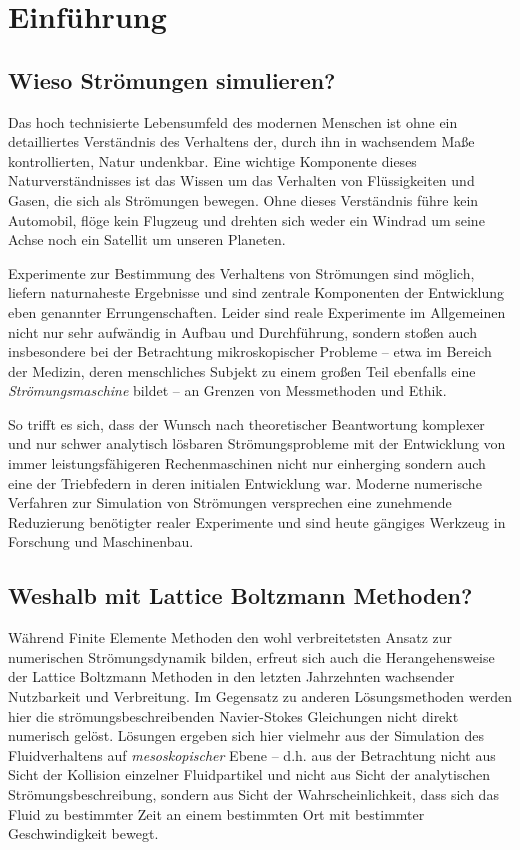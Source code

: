 \section{Einführung}

\subsection{Wieso Strömungen simulieren?}

Das hoch technisierte Lebensumfeld des modernen Menschen ist ohne ein detailliertes Verständnis des Verhaltens der, durch ihn in wachsendem Maße kontrollierten, Natur undenkbar. Eine wichtige Komponente dieses Naturverständnisses ist das Wissen um das Verhalten von Flüssigkeiten und Gasen, die sich als Strömungen bewegen. Ohne dieses Verständnis führe kein Automobil, flöge kein Flugzeug und drehten sich weder ein Windrad um seine Achse noch ein Satellit um unseren Planeten.

Experimente zur Bestimmung des Verhaltens von Strömungen sind möglich, liefern naturnaheste Ergebnisse und sind zentrale Komponenten der Entwicklung eben genannter Errungenschaften. Leider sind reale Experimente im Allgemeinen nicht nur sehr aufwändig in Aufbau und Durchführung, sondern stoßen auch insbesondere bei der Betrachtung mikroskopischer Probleme -- etwa im Bereich der Medizin, deren menschliches Subjekt zu einem großen Teil ebenfalls eine \emph{Strömungsmaschine} bildet -- an Grenzen von Messmethoden und Ethik.

So trifft es sich, dass der Wunsch nach theoretischer Beantwortung komplexer und nur schwer analytisch lösbaren Strömungsprobleme mit der Entwicklung von immer leistungsfähigeren Rechenmaschinen nicht nur einherging sondern auch eine der Triebfedern in deren initialen Entwicklung war. Moderne numerische Verfahren zur Simulation von Strömungen versprechen eine zunehmende Reduzierung benötigter realer Experimente und sind heute gängiges Werkzeug in Forschung und Maschinenbau.

\subsection{Weshalb mit Lattice Boltzmann Methoden?}

Während Finite Elemente Methoden den wohl verbreitetsten Ansatz zur numerischen Strömungsdynamik bilden, erfreut sich auch die Herangehensweise der Lattice Boltzmann Methoden in den letzten Jahrzehnten wachsender Nutzbarkeit und Verbreitung. Im Gegensatz zu anderen Lösungsmethoden werden hier die strömungsbeschreibenden Navier-Stokes Gleichungen nicht direkt numerisch gelöst. Lösungen ergeben sich hier vielmehr aus der Simulation des Fluidverhaltens auf \emph{mesoskopischer} Ebene -- d.h. aus der Betrachtung nicht aus Sicht der Kollision einzelner Fluidpartikel und nicht aus Sicht der analytischen Strömungsbeschreibung, sondern aus Sicht der Wahrscheinlichkeit, dass sich das Fluid zu bestimmter Zeit an einem bestimmten Ort mit bestimmter Geschwindigkeit bewegt.

